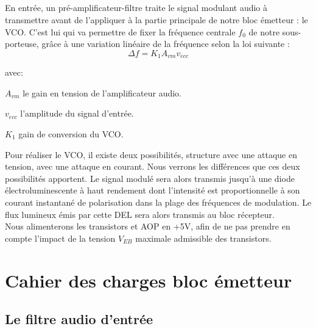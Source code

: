 \documentclass[a4paper]{report}
\begin{document}
\paragraph*{}

En entrée, un pré-amplificateur-filtre traite le signal modulant audio à transmettre avant de l'appliquer à la partie principale de notre bloc émetteur : le VCO. C'est lui qui va permettre de fixer la fréquence centrale $f_0$ de notre sous-porteuse, grâce à une variation linéaire de la fréquence selon la loi suivante :\\ 

$$\Delta f = K_1A_{vm}v_{ecc}$$

avec:
\begin{description}
\item	$A_{vm}$ le gain en tension de l'amplificateur audio.
\item $v_{ecc}$ l'amplitude du signal d'entrée.
\item $K_1$ gain de conversion du VCO.
\end{description}


\vspace{0.5cm}
Pour réaliser le VCO, il existe deux possibilités, structure avec une attaque en tension, avec une attaque en courant. Nous verrons les différences que ces deux possibilités apportent. Le signal modulé sera alors transmis jusqu'à une diode électroluminescente à haut rendement dont l'intensité est proportionnelle à son courant instantané de polarisation dans la plage des fréquences de modulation. Le flux lumineux émis par cette DEL sera alors transmis au bloc récepteur.\\
\vspace{0.5cm}
Nous alimenterons les transistors et AOP en +5V, afin de ne pas prendre en compte l'impact de la tension $V_{EB}$ maximale admissible des transistors.

\chapter{Cahier des charges bloc émetteur}

\section{Le filtre audio d'entrée}
\end{document}
